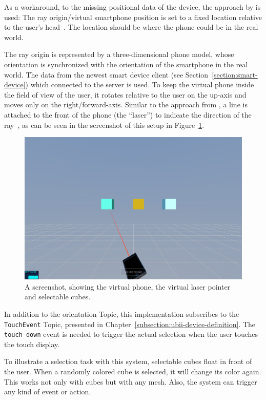 As a workaround, to the missing positional data of the device, the approach by \citeauthor{Pietroszek.2014} is used: The ray origin/virtual smartphone position is set to a fixed location relative to the user's head~\cite[Figure 3]{Pietroszek.2014}. The location should be where the phone could be in the real world.

The ray origin is represented by a three-dimensional phone model, whose orientation is synchronized with the orientation of the smartphone in the real world. The data from the newest smart device client (see Section~\ref{section:smart-device}) which connected to the server is used. To keep the virtual phone inside the field of view of the user, it rotates relative to the user on the up-axis and moves only on the right/forward-axis.
Similar to the approach from \citeauthor{Steed.2013}, a line is attached to the front of the phone (the \enquote{laser}) to indicate the direction of the ray~\cite[46]{Steed.2013}, as can be seen in the screenshot of this setup in Figure~\ref{fig:screenshot-exp-lp}.

\begin{figure}[H]
	\centering
	\includegraphics[width=12cm]{figures/implementation/screenshot_exp_lp.png}
	\caption[Screenshot of the laser pointer]{A screenshot, showing the virtual phone, the virtual laser pointer and selectable cubes.}\label{fig:screenshot-exp-lp}
\end{figure}

In addition to the orientation Topic, this implementation subscribes to the \lstinline{TouchEvent} Topic, presented in Chapter~\ref{subsection:ubii-device-definition}. The \lstinline{touch down} event is needed to trigger the actual selection when the user touches the touch display.

To illustrate a selection task with this system, selectable cubes float in front of the user. 
When a randomly colored cube is selected, it will change its color again. This works not only with cubes but with any mesh. Also, the system can trigger any kind of event or action.


